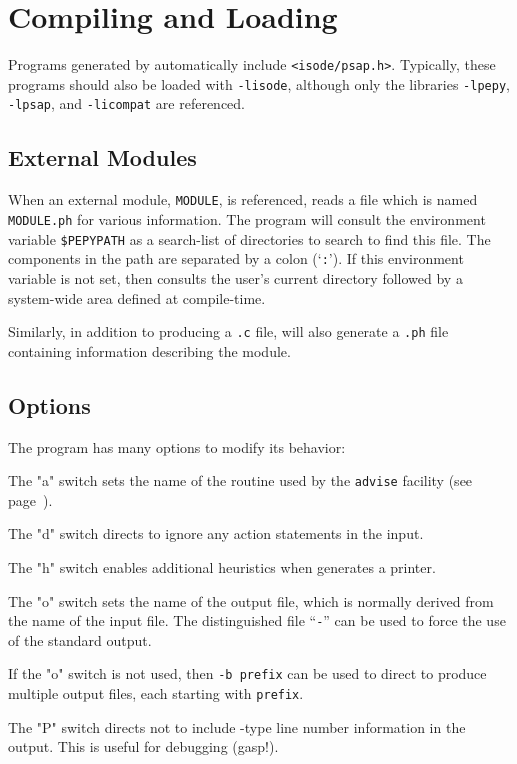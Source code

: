 \section	{Compiling and Loading}
Programs generated by  automatically include
\verb"<isode/psap.h>".
Typically,
these programs should also be loaded with \verb"-lisode",
although only the libraries \verb"-lpepy",
\verb"-lpsap", and \verb"-licompat" are referenced.

\subsection	{External Modules}
When an external module, \verb"MODULE", is referenced,
 reads a file which is named \verb"MODULE.ph" for various
information.
The  program will consult the environment variable \verb"$PEPYPATH"
as a search-list of directories to search to find this file.
The components in the path are separated by a colon (`\verb":"').
If this environment variable is not set,
then  consults the user's current directory followed by a
system-wide area defined at compile-time.

Similarly,
in addition to producing a \verb".c" file,
 will also generate a \verb".ph" file containing information
describing the module.

\subsection	{Options}
The  program has many options to modify its behavior:

The \switch"a" switch sets the name of the routine used by the \verb"advise"
facility (see page~\pageref{pepy:advise}).

The \switch"d" switch directs  to ignore any action statements in
the input.

The \switch"h" switch enables additional heuristics when  generates
a printer.

The \switch"o" switch sets the name of the output file,
which is normally derived from the name of the input file.
The distinguished file ``\verb"-"'' can be used to force the use of the
standard output.

If the \switch"o" switch is not used,
then \verb*"-b prefix" can be used to direct  to produce multiple
output files, each starting with \verb"prefix".

The \switch"P" switch directs  not to include -type line
number information in the output.
This is useful for debugging  (gasp!).

